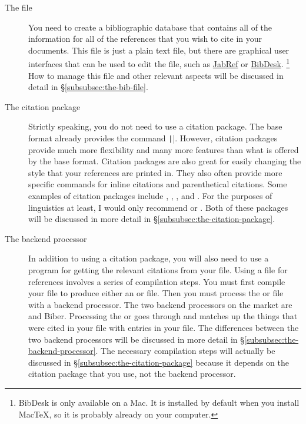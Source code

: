 \begin{description}

	\item[The  file]{%
		You need to create a bibliographic database that contains all of the information for all of the references that you wish to cite in your  documents.
		This file is just a plain text file, but there are graphical user interfaces that can be used to edit the file, such as \href{http://jabref.sourceforge.net/}{JabRef} or \href{http://bibdesk.sourceforge.net/}{BibDesk}.%
		\footnote{%
		BibDesk is only available on a Mac.
		It is installed by default when you install {Mac\TeX}, so it is probably already on your computer.%
		}
		How to manage this file and other relevant aspects will be discussed in detail in \S\ref{subsubsec:the-bib-file}.%
	}

	\item[The citation package]{%
		Strictly speaking, you do not need to use a citation package.
		The base  format already provides the command \texttt|\cite{...}|.
		However, citation packages provide much more flexibility and many more features than what is offered by the base  format.
		Citation packages are also great for easily changing the style that your references are printed in.
		They also often provide more specific commands for inline citations and parenthetical citations.
		Some examples of citation packages include , , , and .
		For the purposes of linguistics at least, I would only recommend  or .
		Both of these packages will be discussed in more detail in \S\ref{subsubsec:the-citation-package}.%
	}

	\item[The backend processor]{%
		In addition to using a citation package, you will also need to use a program for getting the relevant citations from your  file.
		Using a  file for references involves a series of compilation steps.
		You must first compile your  file to produce either an  or  file.
		Then you must process the  or  file with a backend processor.
		The two backend processors on the market are  and Biber.
		Processing the  or  goes through and matches up the things that were cited in your  file with entries in your  file.
		The differences between the two backend processors will be discussed in more detail in \S\ref{subsubsec:the-backend-processor}.
		The necessary compilation steps will actually be discussed in \S\ref{subsubsec:the-citation-package} because it depends on the citation package that you use, not the backend processor.%
	}

\end{description}


